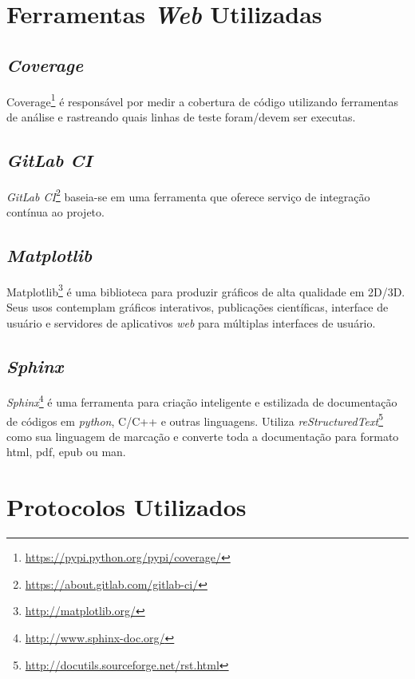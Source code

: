 \section{Ferramentas \textit{Web} Utilizadas}
    \subsection{\textit{Coverage}}
    Coverage\footnote{\url{https://pypi.python.org/pypi/coverage/}} é responsável por medir a cobertura de código utilizando ferramentas de análise e rastreando quais
    linhas de teste foram/devem ser executas.

    \subsection{\textit{GitLab CI}}
    \textit{GitLab CI}\footnote{\url{https://about.gitlab.com/gitlab-ci/}} baseia-se em uma ferramenta que oferece serviço de integração contínua ao projeto.

    \subsection{\textit{Matplotlib}}
    Matplotlib\footnote{\url{http://matplotlib.org/}} é uma biblioteca para produzir gráficos de alta qualidade em 2D/3D. Seus usos contemplam gráficos interativos, publicações científicas, interface de usuário e servidores de aplicativos \textit{web} para múltiplas interfaces de usuário.

    \subsection{\textit{Sphinx}}
    \textit{Sphinx}\footnote{\url{http://www.sphinx-doc.org/}} é uma ferramenta para criação inteligente e estilizada de documentação de códigos em \textit{python}, C/C++
    e outras linguagens. Utiliza \textit{reStructuredText}\footnote{\url{http://docutils.sourceforge.net/rst.html}} como sua linguagem de marcação e converte toda a documentação para formato html, pdf, epub ou man.

\section{Protocolos Utilizados}
